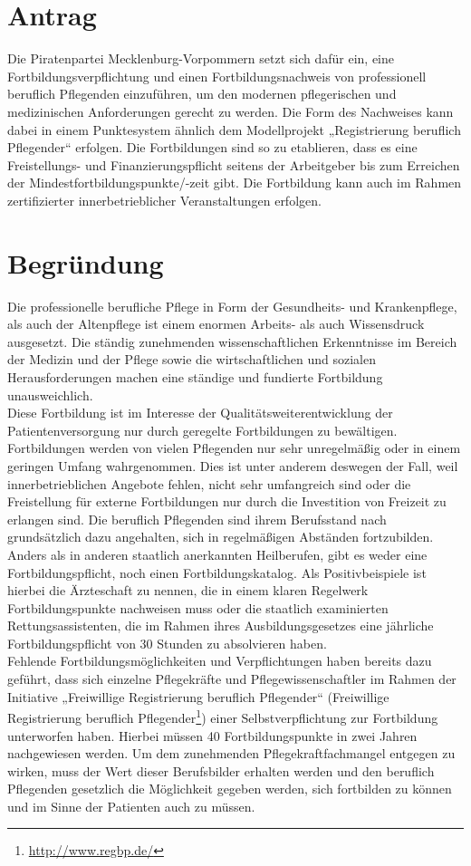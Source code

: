 \section{Antrag}

Die Piratenpartei Mecklenburg-Vorpommern setzt sich dafür ein, eine Fortbildungsverpflichtung und einen Fortbildungsnachweis von professionell beruflich Pflegenden einzuführen, um den modernen pflegerischen und medizinischen Anforderungen gerecht zu werden. Die Form des Nachweises kann dabei in einem Punktesystem ähnlich dem Modellprojekt „Registrierung beruflich Pflegender`` erfolgen. Die Fortbildungen sind so zu etablieren, dass es eine Freistellungs- und Finanzierungspflicht seitens der Arbeitgeber bis zum Erreichen der Mindestfortbildungspunkte/-zeit gibt. Die Fortbildung kann auch im Rahmen zertifizierter innerbetrieblicher Veranstaltungen erfolgen.

\section{Begründung}

Die professionelle berufliche Pflege in Form der Gesundheits- und Krankenpflege, als auch der Altenpflege ist einem enormen Arbeits- als auch Wissensdruck ausgesetzt. Die ständig zunehmenden wissenschaftlichen Erkenntnisse im Bereich der Medizin und der Pflege sowie die wirtschaftlichen und sozialen Herausforderungen machen eine ständige und fundierte Fortbildung unausweichlich.\\Diese Fortbildung ist im Interesse der Qualitätsweiterentwicklung der Patientenversorgung nur durch geregelte Fortbildungen zu bewältigen. Fortbildungen werden von vielen Pflegenden nur sehr unregelmäßig oder in einem geringen Umfang wahrgenommen. Dies ist unter anderem deswegen der Fall, weil innerbetrieblichen Angebote fehlen, nicht sehr umfangreich sind oder die Freistellung für externe Fortbildungen nur durch die Investition von Freizeit zu erlangen sind. Die beruflich Pflegenden sind ihrem Berufsstand nach grundsätzlich dazu angehalten, sich in regelmäßigen Abständen fortzubilden. Anders als in anderen staatlich anerkannten Heilberufen, gibt es weder eine Fortbildungspflicht, noch einen Fortbildungskatalog. Als Positivbeispiele ist hierbei die Ärzteschaft zu nennen, die in einem klaren Regelwerk Fortbildungspunkte nachweisen muss oder die staatlich examinierten Rettungsassistenten, die im Rahmen ihres Ausbildungsgesetzes eine jährliche Fortbildungspflicht von 30 Stunden zu absolvieren haben.\\Fehlende Fortbildungsmöglichkeiten und Verpflichtungen haben bereits dazu geführt, dass sich einzelne Pflegekräfte und Pflegewissenschaftler im Rahmen der Initiative „Freiwillige Registrierung beruflich Pflegender`` (Freiwillige Registrierung beruflich Pflegender\footnote{\url{http://www.regbp.de/}}) einer Selbstverpflichtung zur Fortbildung unterworfen haben. Hierbei müssen 40 Fortbildungspunkte in zwei Jahren nachgewiesen werden. Um dem zunehmenden Pflegekraftfachmangel entgegen zu wirken, muss der Wert dieser Berufsbilder erhalten werden und den beruflich Pflegenden gesetzlich die Möglichkeit gegeben werden, sich fortbilden zu können und im Sinne der Patienten auch zu müssen.

